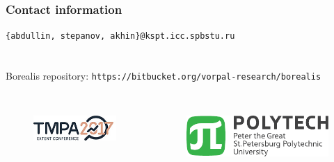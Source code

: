 
\begin{frame}[fragile]
\frametitle{Contact information}
\texttt{\{abdullin, stepanov, akhin\}@kspt.icc.spbstu.ru} \\ \ \\ \ \\
Borealis repository: \texttt{https://bitbucket.org/vorpal-research/borealis}
\\ \ \\ 
\begin{columns} 
	\begin{figure}
		\includegraphics[width=0.7\linewidth]{image/tmpalogo} 
	\end{figure}
	\begin{figure}
		\includegraphics[width=0.7\linewidth]{image/polytech_logo_en} 
	\end{figure}
\end{columns}
\end{frame}

